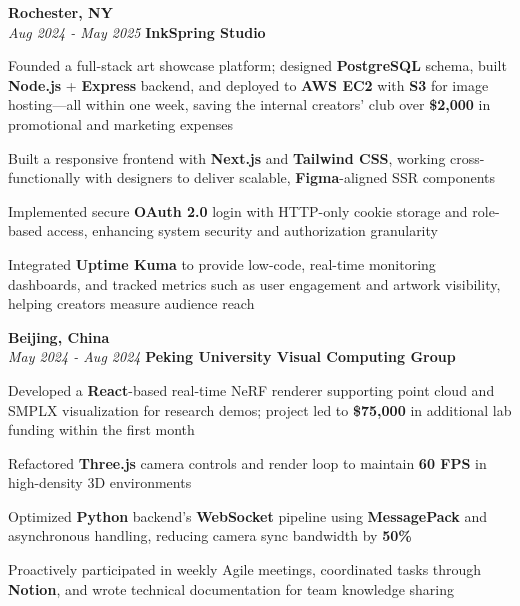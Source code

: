 \begin{twocolentry}{
    \textbf{Rochester, NY} \\
    \textit{Aug 2024 - May 2025}
}{
    \textbf{InkSpring Studio} \\
}
\end{twocolentry}
\begin{onecolentry}
    \begin{highlights}
        \item Founded a full-stack art showcase platform; designed \textbf{PostgreSQL} schema, built \textbf{Node.js} + \textbf{Express} backend, and deployed to \textbf{AWS EC2} with \textbf{S3} for image hosting—all within one week, saving the internal creators' club over \textbf{\$2,000} in promotional and marketing expenses
        \item Built a responsive frontend with \textbf{Next.js} and \textbf{Tailwind CSS}, working cross-functionally with designers to deliver scalable, \textbf{Figma}-aligned SSR components
        \item Implemented secure \textbf{OAuth 2.0} login with HTTP-only cookie storage and role-based access, enhancing system security and authorization granularity
        \item Integrated \textbf{Uptime Kuma} to provide low-code, real-time monitoring dashboards, and tracked metrics such as user engagement and artwork visibility, helping creators measure audience reach
    \end{highlights}
\end{onecolentry}

\vspace{0.2cm}

\begin{twocolentry}{
    \textbf{Beijing, China} \\
    \textit{May 2024 - Aug 2024}
}{
    \textbf{Peking University Visual Computing Group} \\
}
\end{twocolentry}
\begin{onecolentry}
    \begin{highlights}
        \item Developed a \textbf{React}-based real-time NeRF renderer supporting point cloud and SMPLX visualization for research demos; project led to \textbf{\$75,000} in additional lab funding within the first month
        \item Refactored \textbf{Three.js} camera controls and render loop to maintain \textbf{60 FPS} in high-density 3D environments
        \item Optimized \textbf{Python} backend's \textbf{WebSocket} pipeline using \textbf{MessagePack} and asynchronous handling, reducing camera sync bandwidth by \textbf{50\%}
        \item Proactively participated in weekly Agile meetings, coordinated tasks through \textbf{Notion}, and wrote technical documentation for team knowledge sharing
    \end{highlights}
\end{onecolentry}
